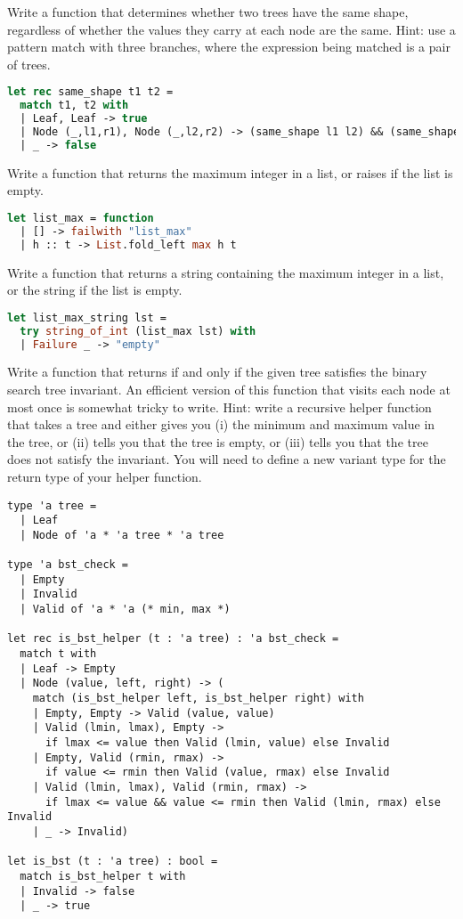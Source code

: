\problem[shape]
Write a function  that determines whether two trees have the same shape, regardless of whether the values they carry at each node are the same. Hint: use a pattern match with three branches, where the expression being matched is a pair of trees.

\begin{lstlisting}[language=OCaml]
let rec same_shape t1 t2 =
  match t1, t2 with
  | Leaf, Leaf -> true
  | Node (_,l1,r1), Node (_,l2,r2) -> (same_shape l1 l2) && (same_shape r1 r2)
  | _ -> false
\end{lstlisting}

Write a function  that returns the maximum integer in a list, or raises  if the list is empty.

\begin{lstlisting}[language=OCaml]
let list_max = function
  | [] -> failwith "list_max"
  | h :: t -> List.fold_left max h t
\end{lstlisting}

Write a function  that returns a string containing the maximum integer in a list, or the string  if the list is empty.

\begin{lstlisting}[language=OCaml]
let list_max_string lst =
  try string_of_int (list_max lst) with
  | Failure _ -> "empty"
\end{lstlisting}

Write a function  that returns  if and only if the given tree satisfies the binary search tree invariant. An efficient version of this function that visits each node at most once is somewhat tricky to write. Hint: write a recursive helper function that takes a tree and either gives you (i) the minimum and maximum value in the tree, or (ii) tells you that the tree is empty, or (iii) tells you that the tree does not satisfy the invariant. You will need to define a new variant type for the return type of your helper function.

\begin{lstlisting}
type 'a tree =
  | Leaf
  | Node of 'a * 'a tree * 'a tree

type 'a bst_check =
  | Empty
  | Invalid
  | Valid of 'a * 'a (* min, max *)

let rec is_bst_helper (t : 'a tree) : 'a bst_check =
  match t with
  | Leaf -> Empty
  | Node (value, left, right) -> (
    match (is_bst_helper left, is_bst_helper right) with
    | Empty, Empty -> Valid (value, value)
    | Valid (lmin, lmax), Empty ->
      if lmax <= value then Valid (lmin, value) else Invalid
    | Empty, Valid (rmin, rmax) ->
      if value <= rmin then Valid (value, rmax) else Invalid
    | Valid (lmin, lmax), Valid (rmin, rmax) ->
      if lmax <= value && value <= rmin then Valid (lmin, rmax) else Invalid
    | _ -> Invalid)

let is_bst (t : 'a tree) : bool =
  match is_bst_helper t with
  | Invalid -> false
  | _ -> true
\end{lstlisting}

